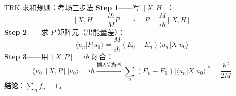\begin{cheatbox}{TRK 求和规则：考场三步法}
\textbf{Step 1}——写 $[X,H]$：
\[
  [X,H] = \frac{i\hbar}{M}P \quad\Rightarrow\quad P = \frac{M}{i\hbar}[X,H]
\]
\textbf{Step 2}——求 $P$ 矩阵元（出能量差）：
\[
  \langle u_n|P|u_0\rangle = \frac{M}{i\hbar}(E_0-E_n)\langle u_n|X|u_0\rangle
\]
\textbf{Step 3}——用 $[X,P]=i\hbar$ 闭合：
\[
  \langle u_0|[X,P]|u_0\rangle = i\hbar \xrightarrow{\text{插入完备基}} \sum_n (E_n-E_0)|\langle u_n|X|u_0\rangle|^2 = \frac{\hbar^2}{2M}
\]
\textbf{结论}：$\displaystyle\sum_n f_n = 1$。
\end{cheatbox}
